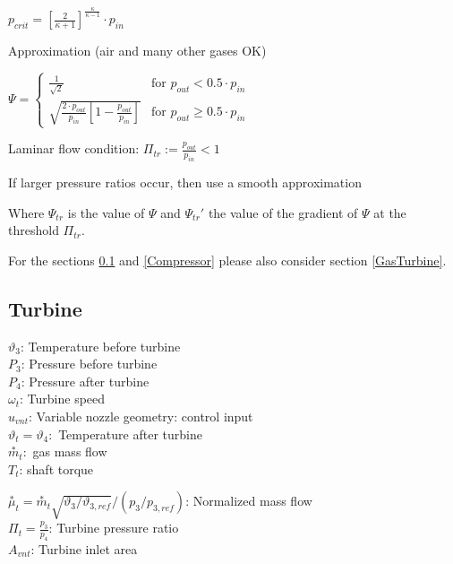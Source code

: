 \documentclass[10pt,a4paper]{scrartcl}
\begin{document}
\begin{multicols*}{3}
\begin{enumerate}
$p_{crit}=\left[\frac{2}{\kappa+1}\right]^{\frac{\kappa}{\kappa-1}} \cdot p_{in}$

\finn

Approximation (air and many other gases OK)

$\Psi=\begin{cases}\frac{1}{\sqrt{2}}&\text{for }p_{out}<0.5 \cdot p_{in}\\\sqrt{\frac{2 \cdot p_{out}}{p_{in}}\left[1-\frac{p_{out}}{p_{in}}\right]}&\text{for }p_{out}\geq 0.5 \cdot p_{in}\end{cases}$

Laminar flow condition: $\Pi_{tr}:=\frac{p_{out}}{p_{in}}<1$

If larger pressure ratios occur, then use a smooth approximation



Where $\Psi_{tr}$ is the value of $\Psi$ and $\Psi_{tr}'$ the value of the gradient of $\Psi$ at the threshold $\Pi_{tr}$.

\end{enumerate}

\vfill
For the sections \ref{Turbine} and \ref{Compressor} please also consider section \ref{GasTurbine}.
\columnbreak

\subsection{Turbine}\label{Turbine}


$\vartheta_3$: Temperature before turbine \\
$P_3$: Pressure before turbine \\
$P_4$: Pressure after turbine \\
$\omega_t$: Turbine speed \\
$u_{vnt}$: Variable nozzle geometry: control input \\
$\vartheta_t=\vartheta_4:$ Temperature after turbine \\
$\overset{\ast}{m}_t:$ gas mass flow \\
$T_t$: shaft torque


$\overset{\ast}{\mu}_t=\overset{\ast}{m}_t\sqrt{\vartheta_3/\vartheta_{3,ref}}/(p_3/p_{3,ref})$: Normalized mass flow \\
$\Pi_t=\frac{p_3}{p_4}$: Turbine pressure ratio \\
$A_{vnt}$: Turbine inlet area


\end{multicols*}
\end{document}
